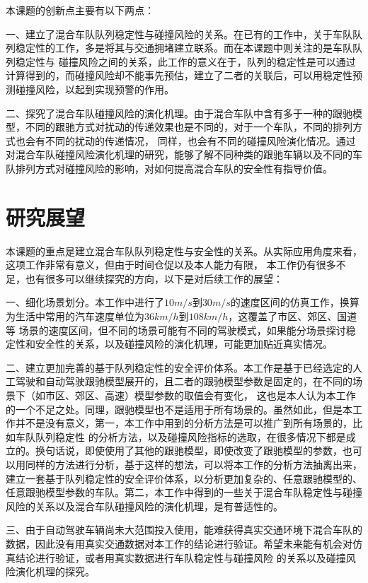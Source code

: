 本课题的创新点主要有以下两点：

一、建立了混合车队队列稳定性与碰撞风险的关系。在已有的工作中，关于车队队列稳定性的工作，多是将其与交通拥堵建立联系。而在本课题中则关注的是车队队列稳定性与
碰撞风险之间的关系，此工作的意义在于，队列的稳定性是可以通过计算得到的，而碰撞风险却不能事先预估，建立了二者的关联后，可以用稳定性预测碰撞风险，以起到实现预警的作用。

二、探究了混合车队碰撞风险的演化机理。由于混合车队中含有多于一种的跟驰模型，不同的跟驰方式对扰动的传递效果也是不同的，对于一个车队，不同的排列方式也会有不同的扰动的传递情况，
同样，也会有不同的碰撞风险演化情况。通过对混合车队碰撞风险演化机理的研究，能够了解不同种类的跟驰车辆以及不同的车队排列方式对碰撞风险的影响，对如何提高混合车队的安全性有指导价值。

\section{研究展望}

本课题的重点是建立混合车队队列稳定性与安全性的关系。从实际应用角度来看，这项工作非常有意义，但由于时间仓促以及本人能力有限，
本工作仍有很多不足，也有很多可以继续探究的方向，以下是对后续工作的展望：

一、细化场景划分。本工作中进行了$10m/s$到$30m/s$的速度区间的仿真工作，换算为生活中常用的汽车速度单位为$36km/h$到$108km/h$，这覆盖了市区、郊区、国道等
场景的速度区间，但不同的场景可能有不同的驾驶模式，如果能分场景探讨稳定性和安全性的关系，以及碰撞风险的演化机理，可能更加贴近真实情况。

二、建立更加完善的基于队列稳定性的安全评价体系。本工作是基于已经选定的人工驾驶和自动驾驶跟驰模型展开的，且二者的跟驰模型参数是固定的，在不同的场景下（如市区、郊区、高速）模型参数的取值会有变化，
这也是本人认为本工作的一个不足之处。同理，跟驰模型也不是适用于所有场景的。虽然如此，但是本工作并不是没有意义，第一，本工作中用到的分析方法是可以推广到所有场景的，比如车队队列稳定性
的分析方法，以及碰撞风险指标的选取，在很多情况下都是成立的。换句话说，即使使用了其他的跟驰模型，即使改变了跟驰模型的参数，也可以用同样的方法进行分析，基于这样的想法，可以将本工作的分析方法抽离出来，
建立一套基于队列稳定性的安全评价体系，以分析更加复杂的、任意跟驰模型的、任意跟驰模型参数的车队。第二，本工作中得到的一些关于混合车队稳定性与碰撞风险的关系以及混合车队碰撞风险的演化机理，是有普适性的。

三、由于自动驾驶车辆尚未大范围投入使用，能难获得真实交通环境下混合车队的数据，因此没有用真实交通数据对本工作的结论进行验证。希望未来能有机会对仿真结论进行验证，或者用真实数据进行车队稳定性与碰撞风险
的关系以及碰撞风险演化机理的探究。